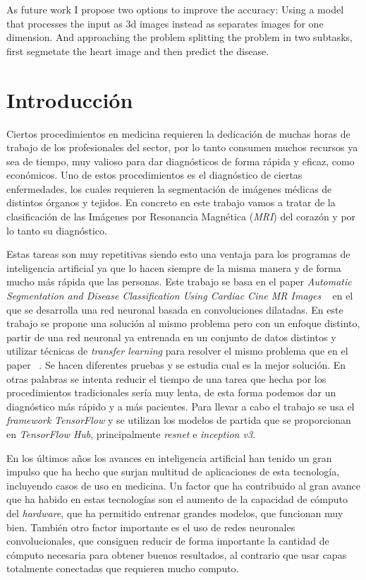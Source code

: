 \documentclass[12pt,a4paper]{article}
\begin{document}
As future work I propose two options to improve the accuracy: Using a model that processes the input as 3d images instead as separates images for one dimension. And approaching the problem splitting the problem in two subtasks, first segmetate the heart image and then predict the disease.

\newpage
\section{Introducción}
\fancyhead[L]{\nouppercase{\rightmark}}

Ciertos procedimientos en medicina requieren la dedicación de muchas horas de trabajo de los profesionales del sector, por lo tanto consumen muchos recursos ya sea de tiempo, muy valioso para dar diagnósticos de forma rápida y eficaz, como económicos. Uno de estos procedimientos es el diagnóstico de ciertas enfermedades, los cuales requieren la segmentación de imágenes médicas de distintos órganos y tejidos. En concreto en este trabajo vamos a tratar de la clasificación de las Imágenes por Resonancia Magnética (\textit{MRI}) del corazón y por lo tanto su diagnóstico.
\bigskip

Estas tareas son muy repetitivas siendo esto una ventaja para los programas de inteligencia artificial ya que lo hacen siempre de la misma manera y de forma mucho más rápida que las personas. Este trabajo se basa en el paper \textit{Automatic Segmentation and Disease Classification Using Cardiac Cine MR Images} ~\cite{DBLP:journals/corr/abs-1708-01141} en el que se desarrolla una red neuronal basada en convoluciones dilatadas. En este trabajo se propone una solución al mismo problema pero con un enfoque distinto, partir de una red neuronal ya entrenada en un conjunto de datos distintos y utilizar técnicas de \textit{transfer learning} para resolver el mismo problema que en el paper ~\cite{DBLP:journals/corr/abs-1708-01141}. Se hacen diferentes pruebas y se estudia cual es la mejor solución. En otras palabras se intenta reducir el tiempo de una tarea que hecha por los procedimientos tradicionales sería muy lenta, de esta forma podemos dar un diagnóstico más rápido y a más pacientes. Para llevar a cabo el trabajo se usa el \textit{framework} \textit{TensorFlow} y se utilizan los modelos de partida que se proporcionan en \textit{TensorFlow Hub}, principalmente \textit{resnet} e \textit{inception v3}.
\bigskip

En los últimos años los avances en inteligencia artificial han tenido un gran impulso que ha hecho que surjan multitud de aplicaciones de esta tecnología, incluyendo casos de uso en medicina. Un factor que ha contribuido al gran avance que ha habido en estas tecnologías son el aumento de la capacidad de cómputo del \textit{hardware}, que ha permitido entrenar grandes modelos, que funcionan muy bien. También otro factor importante es el uso de redes neuronales convolucionales, que consiguen reducir de forma importante la cantidad de cómputo necesaria para obtener buenos resultados, al contrario que usar capas totalmente conectadas que requieren mucho computo.
\bigskip
\end{document}
